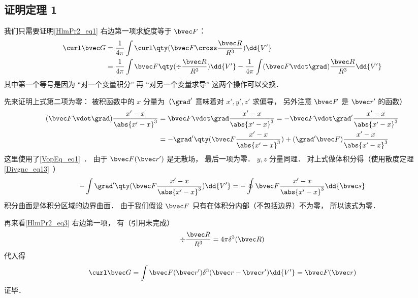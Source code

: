 \subsection{证明定理 1}
我们只需要证明\autoref{HlmPr2_eq1} 右边第一项求旋度等于 $\bvec F$：
\begin{equation}\label{HlmPr2_eq3}
\begin{aligned}
\curl \bvec G &= \frac{1}{4\pi}\int \curl \qty(\bvec F \cross \frac{\bvec R}{R^3}) \dd{V'}\\
&= \frac{1}{4\pi}\int\bvec F \qty(\div \frac{\bvec R}{R^3}) \dd{V'} -  \frac{1}{4\pi}\int(\bvec F \vdot \grad) \frac{\bvec R}{R^3} \dd{V'}
\end{aligned}
\end{equation}
其中第一个等号是因为 “对一个变量积分” 再 “对另一个变量求导” 这两个操作可以交换． %

先来证明上式第二项为零： 被积函数中的 $x$ 分量为（$\grad'$ 意味着对 $x', y', z'$ 求偏导， 另外注意 $\bvec F$ 是 $\bvec r'$ 的函数）
\begin{equation}\label{HlmPr2_eq2}
\begin{aligned}
(\bvec F \vdot \grad) \frac{x' - x}{\abs{x'-x}^3} &= \bvec F \vdot \grad \frac{x' - x}{\abs{x'-x}^3} = -\bvec F \vdot \grad' \frac{x' - x}{\abs{x'-x}^3}\\
&= - \grad'\qty(\bvec F \frac{x' - x}{\abs{x'-x}^3}) + (\grad'\bvec F) \frac{x' - x}{\abs{x'-x}^3}
\end{aligned}
\end{equation}
这里使用了\autoref{VopEq_eq1}~． 由于 $\bvec F(\bvec r')$ 是无散场， 最后一项为零． $y, z$ 分量同理． 对上式做体积分得（使用散度定理\autoref{Divgnc_eq13}~）
\begin{equation}
- \int \grad'\qty(\bvec F \frac{x' - x}{\abs{x'-x}^3})\dd{V'} = -\oint \bvec F \frac{x' - x}{\abs{x'-x}^3} \dd{\bvec s}
\end{equation}
积分曲面是体积分区域的边界曲面． 由于我们假设 $\bvec F$ 只有在体积分内部（不包括边界）不为零， 所以该式为零．

再来看\autoref{HlmPr2_eq3} 右边第一项， 有（引用未完成）
\begin{equation}
\div \frac{\bvec R}{R^3} = 4\pi \delta^3(\bvec R)
\end{equation}
代入得
\begin{equation}
\curl \bvec G = \int \bvec F(\bvec r') \delta^3(\bvec r - \bvec r') \dd{V'} = \bvec F(\bvec r)
\end{equation}
证毕．

